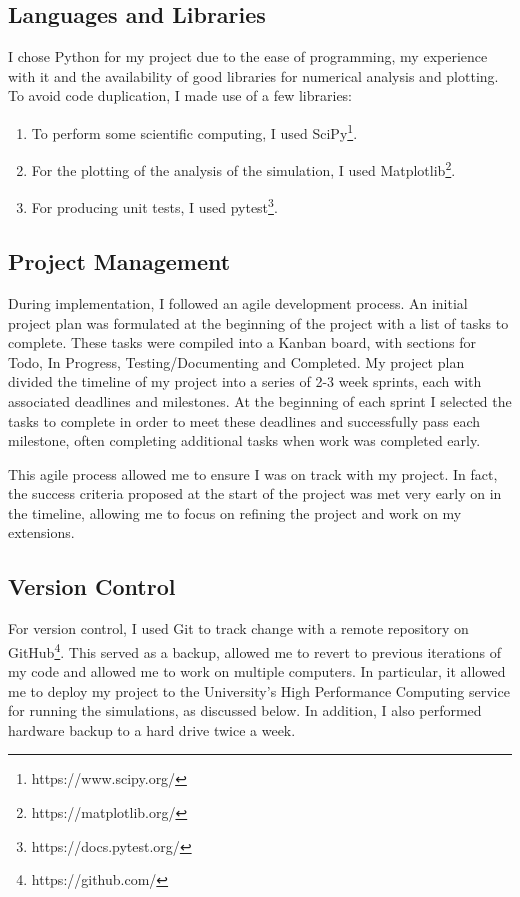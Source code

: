 \documentclass[12pt,a4paper,twoside,openright]{report}
\begin{document}
\subsection{Languages and Libraries}

I chose Python for my project due to the ease of programming, my experience with it and the availability of good libraries for numerical analysis and plotting. To avoid code duplication, I made use of a few libraries:

\begin{enumerate}
 	\item To perform some scientific computing, I used SciPy\footnote{https://www.scipy.org/}.
	\item For the plotting of the analysis of the simulation, I used Matplotlib\footnote{https://matplotlib.org/}. 
	\item For producing unit tests, I used pytest\footnote{https://docs.pytest.org/}.
\end{enumerate}

\subsection{Project Management}

During implementation, I followed an agile development process. An initial project plan was formulated at the beginning of the project with a list of tasks to complete. These tasks were compiled into a Kanban board, with sections for Todo, In Progress, Testing/Documenting and Completed. My project plan divided the timeline of my project into a series of 2-3 week sprints, each with associated deadlines and milestones. At the beginning of each sprint I selected the tasks to complete in order to meet these deadlines and successfully pass each milestone, often completing additional tasks when work was completed early.

This agile process allowed me to ensure I was on track with my project. In fact, the success criteria proposed at the start of the project was met very early on in the timeline, allowing me to focus on refining the project and work on my extensions. 

\subsection{Version Control}

For version control, I used Git to track change with a remote repository on GitHub\footnote{https://github.com/}. This served as a backup, allowed me to revert to previous iterations of my code and allowed me to work on multiple computers. In particular, it allowed me to deploy my project to the University's High Performance Computing service for running the simulations, as discussed below. In addition, I also performed hardware backup to a hard drive twice a week.
\end{document}
